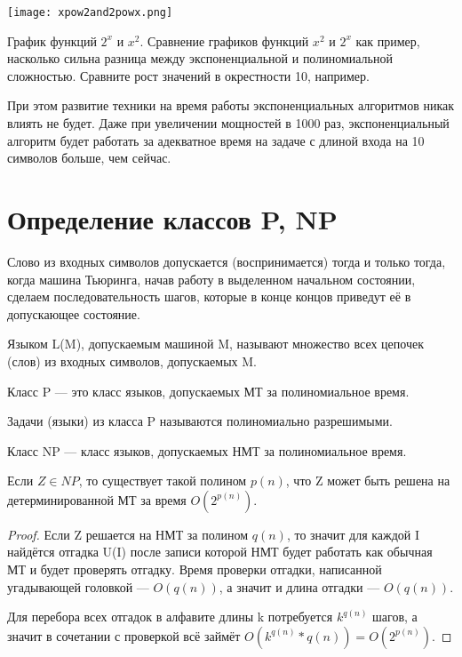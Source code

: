\begin{marginfigure}[-6.5cm]
	\texttt{[image: xpow2and2powx.png]}
	\caption{График функций $2^x$ и $x^2$.
	Сравнение графиков функций $x^2$ и  $2^x$ как пример,
насколько сильна разница между экспоненциальной и полиномиальной
сложностью. Сравните рост значений в
окрестности 10, например.
}
\end{marginfigure}

При этом развитие техники на время работы экспоненциальных алгоритмов никак
влиять не будет. Даже при увеличении мощностей в 1000 раз, экспоненциальный
алгоритм будет работать за адекватное время на задаче с длиной входа на 10
символов больше, чем сейчас.


\section{Определение классов P, NP}

\begin{definition}
	Слово из входных символов допускается (воспринимается) тогда и только
	тогда, когда машина Тьюринга, начав работу в выделенном начальном
	состоянии, сделаем последовательность шагов, которые в конце концов
	приведут её в допускающее состояние.
\end{definition}
\begin{definition}
	Языком L(M), допускаемым машиной M, называют множество всех цепочек
	(слов) из входных символов, допускаемых M.
\end{definition}

\begin{definition}
	Класс P --- это класс языков, допускаемых МТ за полиномиальное
	время. 
\end{definition}
Задачи (языки) из класса P называются полиномиально разрешимыми.
\begin{definition}
	Класс NP --- класс языков, допускаемых НМТ за полиномиальное время.
\end{definition}

\begin{theorem}
	Если $Z\in NP$, то существует такой полином  $p(n)$, что Z может быть
	решена на детерминированной МТ за время  $O(2^{p(n)})$.
\end{theorem}
\begin{proof}
Если Z решается на НМТ за полином $q\left( n \right) $, то значит для каждой I
найдётся отгадка U(I) после записи которой НМТ будет работать как обычная МТ и
будет проверять отгадку. Время проверки отгадки, написанной
угадывающей головкой --- $O(q(n))$, а значит и длина отгадки --- $O(q(n))$. 

Для перебора всех отгадок в алфавите длины k потребуется $k^{q(n)}$ шагов,
а значит в сочетании с
проверкой всё займёт $O(k^{q(n)}*q(n)) = O(2^{p(n)})$.
\end{proof}

